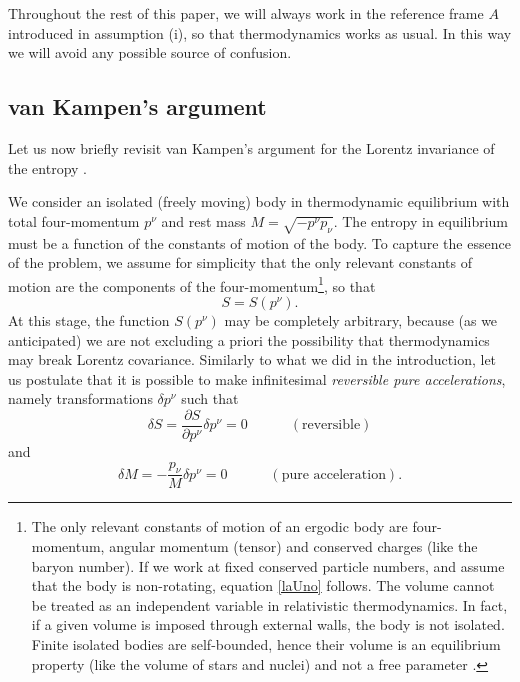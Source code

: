 \documentclass[twocolumn,usenatbib]{mnras2}
\newcommand{\spc}{\quad \quad \quad}
\begin{document}
Throughout the rest of this paper, we will always work in the reference frame $A$ introduced in assumption (i), so that thermodynamics works as usual. In this way we will avoid any possible source of confusion.


\subsection{van Kampen's argument}\label{vanKampennPost}

Let us now briefly revisit van Kampen's argument for the Lorentz invariance of the entropy \citep{vanKampen1968}.

We consider an isolated (freely moving) body in thermodynamic equilibrium with total four-momentum $p^\nu$ and rest mass $M=\sqrt{-p^\nu p_\nu}$. The entropy in equilibrium must be a function of the constants of motion of the body. To capture the essence of the problem, we assume for simplicity that the only relevant constants of motion are the components of the four-momentum\footnote{The only relevant constants of motion of an ergodic body are four-momentum, angular momentum (tensor) and conserved charges (like the baryon number). If we work at fixed conserved particle numbers, and assume that the body is non-rotating, equation \eqref{laUno} follows. The volume cannot be treated as an independent variable in relativistic thermodynamics. In fact, if a given volume is imposed through external walls, the body is not isolated. Finite isolated bodies are self-bounded, hence their volume is an equilibrium property (like the volume of stars and nuclei) and not a free parameter \citep{GavassinoTermometri}.}, so that
\begin{equation}\label{laUno}
S=S(p^\nu).
\end{equation}
At this stage, the function $S(p^\nu)$ may be completely arbitrary, because (as we anticipated) we are not excluding a priori the possibility that thermodynamics may break Lorentz covariance. Similarly to what we did in the introduction, let us postulate that it is possible to make infinitesimal \textit{reversible pure accelerations}, namely transformations $\delta p^\nu$ such that
\begin{equation}\label{2}
\delta S = \dfrac{\partial S}{\partial p^\nu} \delta p^\nu =0 \spc (\text{reversible})
\end{equation}
and
\begin{equation}\label{3}
\delta M = -\dfrac{p_\nu}{M} \delta p^\nu =0 \spc (\text{pure acceleration}).
\end{equation}
\end{document}
